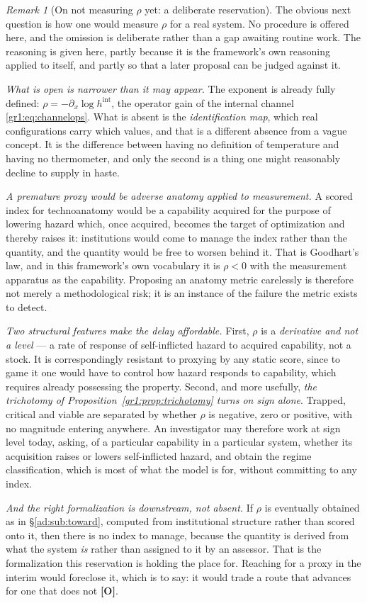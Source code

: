 \documentclass[11pt]{article}
\numberwithin{equation}{section}
\theoremstyle{plain}
\theoremstyle{definition}
\theoremstyle{remark}
\newtheorem{remark}[theorem]{Remark}
\begin{document}
\begin{remark}[On not measuring $\rho$ yet: a deliberate reservation]
\label{gr1:rem:noproxy}
The obvious next question is how one would measure $\rho$ for a real
system. No procedure is offered here, and the omission is deliberate
rather than a gap awaiting routine work. The reasoning is given here, partly because it is the framework's own reasoning applied to itself,
and partly so that a later proposal can be judged against it.

\emph{What is open is narrower than it may appear.} The exponent is
already fully defined: $\rho=-\partial_x\log h^{\mathrm{int}}$, the
operator gain of the internal channel \eqref{gr1:eq:channelops}. What is
absent is the \emph{identification map}, which real configurations
carry which values, and that is a different absence from a vague
concept. It is the difference between having no definition of
temperature and having no thermometer, and only the second is a thing
one might reasonably decline to supply in haste.

\emph{A premature proxy would be adverse anatomy applied to
measurement.} A scored index for technoanatomy would be a capability
acquired for the purpose of lowering hazard which, once acquired,
becomes the target of optimization and thereby raises it: institutions
would come to manage the index rather than the quantity, and the
quantity would be free to worsen behind it. That is Goodhart's law, and
in this framework's own vocabulary it is $\rho<0$ with the measurement
apparatus as the capability. Proposing an anatomy metric carelessly is
therefore not merely a methodological risk; it is an instance of the
failure the metric exists to detect.

\emph{Two structural features make the delay affordable.} First,
$\rho$ is a \emph{derivative and not a level} --- a rate of response of
self-inflicted hazard to acquired capability, not a stock. It is
correspondingly resistant to proxying by any static score, since to
game it one would have to control how hazard responds to capability,
which requires already possessing the property. Second, and more
usefully, \emph{the trichotomy of Proposition~\ref{gr1:prop:trichotomy}
turns on sign alone}. Trapped, critical and viable are separated by
whether $\rho$ is negative, zero or positive, with no magnitude
entering anywhere. An investigator may therefore work at sign level
today, asking, of a particular capability in a particular system,
whether its acquisition raises or lowers self-inflicted hazard, and
obtain the regime classification, which is most of what the model is
for, without committing to any index.

\emph{And the right formalization is downstream, not absent.} If $\rho$
is eventually obtained as in \S\ref{ad:sub:toward}, computed from
institutional structure rather than scored onto it, then there is no
index to manage, because the quantity is derived from what the system
\emph{is} rather than assigned to it by an assessor. That is the
formalization this reservation is holding the place for. Reaching for a
proxy in the interim would foreclose it, which is to say: it would
trade a route that advances for one that does not \textbf{[O]}.
\end{remark}
\end{document}
